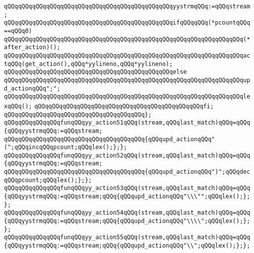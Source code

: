 \verb|qQQqqQQqqQQqqQQqqQQqqQQqqQQqqQQqqQQqqQQqqQQqqQQqyystrmqQQq:=qQQqstream;|\newline
\newline
\verb|qQQqqQQqqQQqqQQqqQQqqQQqqQQqqQQqqQQqqQQqqQQqqQQqifqQQqqQQq(*pcountqQQq==qQQq0)|\newline
\newline
\verb|qQQqqQQqqQQqqQQqqQQqqQQqqQQqqQQqqQQqqQQqqQQqqQQqqQQqqQQqqQQqqQQqqQQq(*after_action)();|\newline
\verb|qQQqqQQqqQQqqQQqqQQqqQQqqQQqqQQqqQQqqQQqqQQqqQQqqQQqqQQqqQQqqQQqqQQqactqQQq(get_action(),qQQq*yylineno,qQQq*yylineno);|\newline
\verb|qQQqqQQqqQQqqQQqqQQqqQQqqQQqqQQqqQQqqQQqqQQqqQQqelse|\newline
\verb|qQQqqQQqqQQqqQQqqQQqqQQqqQQqqQQqqQQqqQQqqQQqqQQqqQQqqQQqqQQqqQQqqQQqupd_actionqQQq";";|\newline
\verb|qQQqqQQqqQQqqQQqqQQqqQQqqQQqqQQqqQQqqQQqqQQqqQQqqQQqqQQqqQQqqQQqqQQqlexqQQq();|\newline
\verb|qQQqqQQqqQQqqQQqqQQqqQQqqQQqqQQqqQQqqQQqqQQqqQQqfi;|\newline
\verb|qQQqqQQqqQQqqQQqqQQqqQQqqQQqqQQqqQQqqQQq};|\newline
\verb|qQQqqQQqqQQqqQQqfunqQQqyy_action51qQQq(stream,qQQqlast_match)qQQq=qQQq{qQQqyystrmqQQq:=qQQqstream;|\newline
\verb|qQQqqQQqqQQqqQQqqQQqqQQqqQQqqQQqqQQqqQQq{qQQqupd_actionqQQq"(";qQQqincqQQqpcount;qQQqlex();};};|\newline
\verb|qQQqqQQqqQQqqQQqfunqQQqyy_action52qQQq(stream,qQQqlast_match)qQQq=qQQq{qQQqyystrmqQQq:=qQQqstream;|\newline
\verb|qQQqqQQqqQQqqQQqqQQqqQQqqQQqqQQqqQQqqQQq{qQQqupd_actionqQQq")";qQQqdecqQQqpcount;qQQqlex();};};|\newline
\verb|qQQqqQQqqQQqqQQqfunqQQqyy_action53qQQq(stream,qQQqlast_match)qQQq=qQQq{qQQqyystrmqQQq:=qQQqstream;qQQq{qQQqupd_actionqQQq"\\\"";qQQqlex();};};|\newline
\verb|qQQqqQQqqQQqqQQqfunqQQqyy_action54qQQq(stream,qQQqlast_match)qQQq=qQQq{qQQqyystrmqQQq:=qQQqstream;qQQq{qQQqupd_actionqQQq"\\\\";qQQqlex();};};|\newline
\verb|qQQqqQQqqQQqqQQqfunqQQqyy_action55qQQq(stream,qQQqlast_match)qQQq=qQQq{qQQqyystrmqQQq:=qQQqstream;qQQq{qQQqupd_actionqQQq"\\";qQQqlex();};};|\newline
